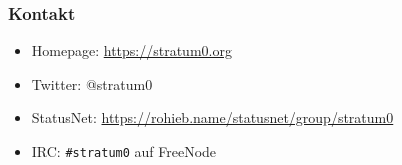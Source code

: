 \documentclass{beamer}
\begin{document}
\begin{frame}
  \frametitle{Kontakt}
  \begin{itemize}
    \item Homepage: \url{https://stratum0.org}
    \item Twitter: @stratum0
    \item StatusNet: \url{https://rohieb.name/statusnet/group/stratum0}
    \item IRC: \texttt{\#stratum0} auf FreeNode
  \end{itemize}
\end{frame}
\end{document}
